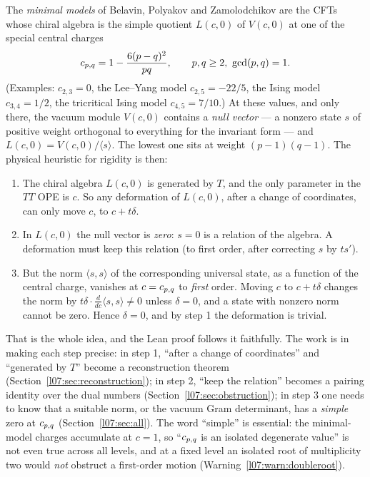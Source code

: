 The \emph{minimal models} of Belavin, Polyakov and Zamolodchikov are the CFTs whose chiral algebra
is the simple quotient $L(c,0)$ of $V(c,0)$ at one of the special central charges
\begin{equation*}
 c_{p,q} = 1-\frac{6(p-q)^2}{pq},\qquad p,q\ge2,\ \gcd(p,q) = 1 .
\end{equation*}
(Examples: $c_{2,3} = 0$, the Lee--Yang model $c_{2,5} = -22/5$, the Ising model $c_{3,4} = 1/2$, the
tricritical Ising model $c_{4,5} = 7/10$.) At these values, and only there, the vacuum module
$V(c,0)$ contains a \emph{null vector} --- a nonzero state $s$ of positive weight orthogonal to
everything for the invariant form --- and $L(c,0) = V(c,0)/\langle s\rangle$. The lowest one sits at
weight $(p-1)(q-1)$. The physical heuristic for rigidity is then:
\begin{enumerate}
\item The chiral algebra $L(c,0)$ is generated by $T$, and the only parameter in the $TT$ OPE is
  $c$. So any deformation of $L(c,0)$, after a change of coordinates, can only move $c$, to
  $c + t\delta$.
\item In $L(c,0)$ the null vector is \emph{zero}: $s = 0$ is a relation of the algebra. A
  deformation must keep this relation (to first order, after correcting $s$ by $t s'$).
\item But the norm $\langle s,s\rangle$ of the corresponding universal state, as a function of the
  central charge, vanishes at $c = c_{p,q}$ to \emph{first} order. Moving $c$ to $c + t\delta$
  changes the norm by $t\delta\cdot\frac{d}{dc}\langle s,s\rangle\ne0$ unless $\delta = 0$, and a
  state with nonzero norm cannot be zero. Hence $\delta = 0$, and by step 1 the deformation is
  trivial.
\end{enumerate}
That is the whole idea, and the Lean proof follows it faithfully. The work is in making each step
precise: in step 1, ``after a change of coordinates'' and ``generated by $T$'' become a
reconstruction theorem (Section~\ref{l07:sec:reconstruction}); in step 2, ``keep the relation''
becomes a pairing identity over the dual numbers (Section~\ref{l07:sec:obstruction}); in step 3 one
needs to know that a suitable norm, or the vacuum Gram determinant, has a \emph{simple} zero at
$c_{p,q}$ (Section~\ref{l07:sec:all}). The word ``simple'' is essential: the minimal-model
charges accumulate at $c = 1$, so ``$c_{p,q}$ is an isolated degenerate value'' is not even true
across all levels, and at a fixed level an isolated root of multiplicity two would \emph{not}
obstruct a first-order motion (Warning~\ref{l07:warn:doubleroot}).

